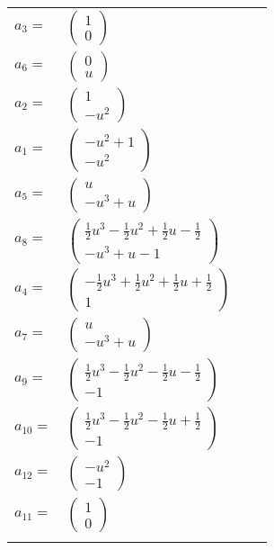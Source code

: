 \documentclass[1p]{elsarticle_modified}
\theoremstyle{definition}
\begin{document}
\begin{tabular}{m{7pt} m{180pt} m{7pt} m{180pt} }
\flushright $a_{3}=$&$\begin{pmatrix}1\\0\end{pmatrix}$ \\
\flushright $a_{6}=$&$\begin{pmatrix}0\\u\end{pmatrix}$ \\
\flushright $a_{2}=$&$\begin{pmatrix}1\\- u^2\end{pmatrix}$ \\
\flushright $a_{1}=$&$\begin{pmatrix}- u^2+1\\- u^2\end{pmatrix}$ \\
\flushright $a_{5}=$&$\begin{pmatrix}u\\- u^3+u\end{pmatrix}$ \\
\flushright $a_{8}=$&$\begin{pmatrix}\frac{1}{2} u^3-\frac{1}{2} u^2+\frac{1}{2} u-\frac{1}{2}\\- u^3+u-1\end{pmatrix}$ \\
\flushright $a_{4}=$&$\begin{pmatrix}-\frac{1}{2} u^3+\frac{1}{2} u^2+\frac{1}{2} u+\frac{1}{2}\\1\end{pmatrix}$ \\
\flushright $a_{7}=$&$\begin{pmatrix}u\\- u^3+u\end{pmatrix}$ \\
\flushright $a_{9}=$&$\begin{pmatrix}\frac{1}{2} u^3-\frac{1}{2} u^2-\frac{1}{2} u-\frac{1}{2}\\-1\end{pmatrix}$ \\
\flushright $a_{10}=$&$\begin{pmatrix}\frac{1}{2} u^3-\frac{1}{2} u^2-\frac{1}{2} u+\frac{1}{2}\\-1\end{pmatrix}$ \\
\flushright $a_{12}=$&$\begin{pmatrix}- u^2\\-1\end{pmatrix}$ \\
\flushright $a_{11}=$&$\begin{pmatrix}1\\0\end{pmatrix}$\\&\end{tabular}
\end{document}
